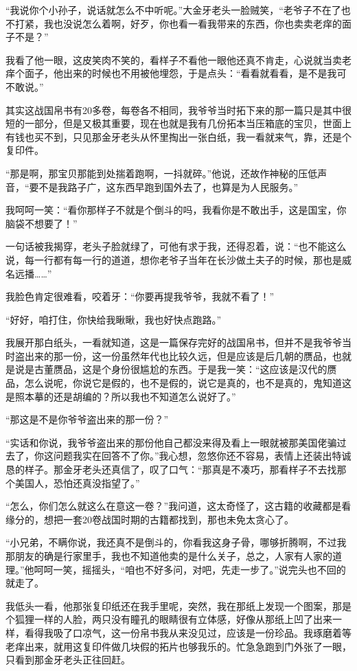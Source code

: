 “我说你个小孙子，说话就怎么不中听呢。”大金牙老头一脸贼笑，“老爷子不在了也不打紧，我也没说怎么着啊，好歹，你也看一看我带来的东西，你也卖卖老痒的面子不是？”

我看了他一眼，这皮笑肉不笑的，看样子不看他一眼他还真不肯走，心说就当卖老痒个面子，他出来的时候也不用被他埋怨，于是点头：“看看就看看，是不是我可不敢说。”

其实这战国帛书有20多卷，每卷各不相同，我爷爷当时拓下来的那一篇只是其中很短的一部分，但是又极其重要，现在也就是我有几份拓本当压箱底的宝贝，世面上有钱也买不到，只见那金牙老头从怀里掏出一张白纸，我一看就来气，靠，还是个复印件。

“那是啊，那宝贝那能到处揣着跑啊，一抖就碎。”他说，还故作神秘的压低声音，“要不是我路子广，这东西早跑到国外去了，也算是为人民服务。”

我呵呵一笑：“看你那样子不就是个倒斗的吗，我看你是不敢出手，这是国宝，你脑袋不想要了！”

一句话被我揭穿，老头子脸就绿了，可他有求于我，还得忍着，说：“也不能这么说，每一行都有每一行的道道，想你老爷子当年在长沙做土夫子的时候，那也是威名远播……”

我脸色肯定很难看，咬着牙：“你要再提我爷爷，我就不看了！”

“好好，咱打住，你快给我瞅瞅，我也好快点跑路。”

我展开那白纸头，一看就知道，这是一篇保存完好的战国帛书，但并不是我爷爷当时盗出来的那一份，这一份虽然年代也比较久远，但是应该是后几朝的赝品，也就是说是古董赝品，这是个身份很尴尬的东西。于是我一笑：“这应该是汉代的赝品，怎么说呢，你说它是假的，也不是假的，说它是真的，也不是真的，鬼知道这是照本摹的还是胡编的？所以我也不知道怎么说好了。”

“那这是不是你爷爷盗出来的那一份？”

“实话和你说，我爷爷盗出来的那份他自己都没来得及看上一眼就被那美国佬骗过去了，你这问题我实在回答不了你。”我心想，忽悠你还不容易，表情上还装出特诚恳的样子。那金牙老头还真信了，叹了口气：“那真是不凑巧，那看样子不去找那个美国人，恐怕还真没指望了。”

“怎么，你们怎么就这么在意这一卷？”我问道，这太奇怪了，这古籍的收藏都是看缘分的，想把一套20卷战国时期的古籍都找到，那也未免太贪心了。

“小兄弟，不瞒你说，我还真不是倒斗的，你看我这身子骨，哪够折腾啊，不过我那朋友的确是行家里手，我也不知道他卖的是什么关子，总之，人家有人家的道理。”他呵呵一笑，摇摇头，“咱也不好多问，对吧，先走一步了。”说完头也不回的就走了。

我低头一看，他那张复印纸还在我手里呢，突然，我在那纸上发现一个图案，那是个狐狸一样的人脸，两只没有瞳孔的眼睛很有立体感，好像从那纸上凹了出来一样，看得我吸了口凉气，这一份帛书我从来没见过，应该是一份珍品。我琢磨着等老痒出来，就用这复印件做几块假的拓片也够我乐的。忙急急跑到门外张了一眼，只看到那金牙老头正往回赶。

